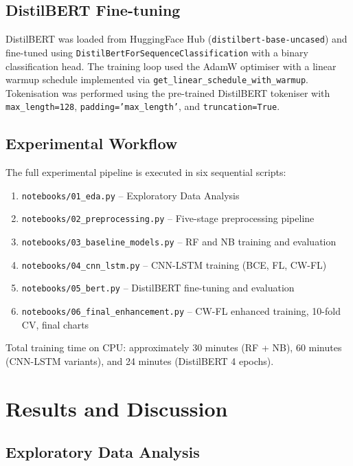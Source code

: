\documentclass[12pt,a4paper,oneside]{report}
\begin{document}
\section{DistilBERT Fine-tuning}

DistilBERT was loaded from HuggingFace Hub (\texttt{distilbert-base-uncased}) and fine-tuned using \texttt{DistilBertForSequenceClassification} with a binary classification head. The training loop used the AdamW optimiser with a linear warmup schedule implemented via \texttt{get\_linear\_schedule\_with\_warmup}. Tokenisation was performed using the pre-trained DistilBERT tokeniser with \texttt{max\_length=128}, \texttt{padding='max\_length'}, and \texttt{truncation=True}.

\section{Experimental Workflow}

The full experimental pipeline is executed in six sequential scripts:
\begin{enumerate}
  \item \texttt{notebooks/01\_eda.py} -- Exploratory Data Analysis
  \item \texttt{notebooks/02\_preprocessing.py} -- Five-stage preprocessing pipeline
  \item \texttt{notebooks/03\_baseline\_models.py} -- RF and NB training and evaluation
  \item \texttt{notebooks/04\_cnn\_lstm.py} -- CNN-LSTM training (BCE, FL, CW-FL)
  \item \texttt{notebooks/05\_bert.py} -- DistilBERT fine-tuning and evaluation
  \item \texttt{notebooks/06\_final\_enhancement.py} -- CW-FL enhanced training, 10-fold CV, final charts
\end{enumerate}

Total training time on CPU: approximately 30 minutes (RF + NB), 60 minutes (CNN-LSTM variants), and 24 minutes (DistilBERT 4 epochs).

\chapter{Results and Discussion}

\section{Exploratory Data Analysis}
\end{document}
